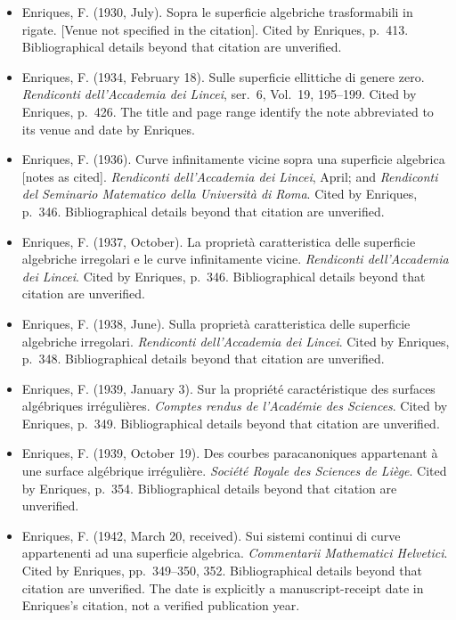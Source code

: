 \begin{sloppypar}
\begin{itemize}
\item Enriques, F. (1930, July). Sopra le superficie algebriche trasformabili in rigate. [Venue not specified in the citation]. Cited by Enriques, p.~413. Bibliographical details beyond that citation are unverified.

\item Enriques, F. (1934, February 18). Sulle superficie ellittiche di genere zero. \emph{Rendiconti dell'Accademia dei Lincei}, ser.~6, Vol.~19, 195--199. Cited by Enriques, p.~426. The title and page range identify the note abbreviated to its venue and date by Enriques.

\item Enriques, F. (1936). Curve infinitamente vicine sopra una superficie algebrica [notes as cited]. \emph{Rendiconti dell'Accademia dei Lincei}, April; and \emph{Rendiconti del Seminario Matematico della Università di Roma}. Cited by Enriques, p.~346. Bibliographical details beyond that citation are unverified.

\item Enriques, F. (1937, October). La proprietà caratteristica delle superficie algebriche irregolari e le curve infinitamente vicine. \emph{Rendiconti dell'Accademia dei Lincei}. Cited by Enriques, p.~346. Bibliographical details beyond that citation are unverified.

\item Enriques, F. (1938, June). Sulla proprietà caratteristica delle superficie algebriche irregolari. \emph{Rendiconti dell'Accademia dei Lincei}. Cited by Enriques, p.~348. Bibliographical details beyond that citation are unverified.

\item Enriques, F. (1939, January 3). Sur la propriété caractéristique des surfaces algébriques irrégulières. \emph{Comptes rendus de l'Académie des Sciences}. Cited by Enriques, p.~349. Bibliographical details beyond that citation are unverified.

\item Enriques, F. (1939, October 19). Des courbes paracanoniques appartenant à une surface algébrique irrégulière. \emph{Société Royale des Sciences de Liège}. Cited by Enriques, p.~354. Bibliographical details beyond that citation are unverified.

\item Enriques, F. (1942, March 20, received). Sui sistemi continui di curve appartenenti ad una superficie algebrica. \emph{Commentarii Mathematici Helvetici}. Cited by Enriques, pp.~349--350, 352. Bibliographical details beyond that citation are unverified. The date is explicitly a manuscript-receipt date in Enriques's citation, not a verified publication year.


\end{itemize}
\end{sloppypar}
